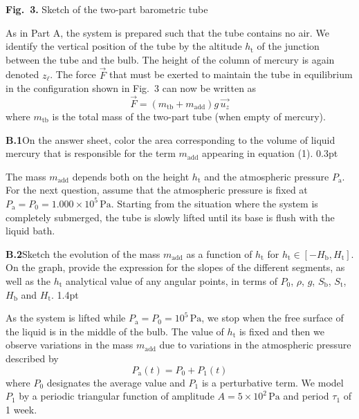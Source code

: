 \begin{center}\textbf{Fig.~3.} Sketch of the two-part barometric tube\end{center}

As in Part A, the system is prepared such that the tube contains no air. We
identify the vertical position of the tube by the altitude $h_\mathrm{t}$ of
the junction between the tube and the bulb. The height of the column of
mercury is again denoted $z_\ell$. The force $\overrightarrow{F}$ that must be
exerted to maintain the tube in equilibrium in the configuration shown in
Fig.~3 can now be written as
\begin{equation}
\overrightarrow{F} = \left(m_\mathrm{tb} + m_\mathrm{add}\right) g\,\overrightarrow{u_z} \tag{1}
\end{equation}
where $m_\mathrm{tb}$ is the total mass of the two-part tube (when empty of
mercury).

\textbf{B.1}\quad On the answer sheet, color the area corresponding to the
volume of liquid mercury that is responsible for the term $m_\mathrm{add}$
appearing in equation (1). \hfill 0.3pt

The mass $m_\mathrm{add}$ depends both on the height $h_\mathrm{t}$ and the
atmospheric pressure $P_\mathrm{a}$. For the next question, assume that the
atmospheric pressure is fixed at
$P_\mathrm{a} = P_0 = 1.000 \times 10^5\,\mathrm{Pa}$. Starting from the
situation where the system is completely submerged, the tube is slowly lifted
until its base is flush with the liquid bath.

\textbf{B.2}\quad Sketch the evolution of the mass $m_\mathrm{add}$ as a
function of $h_\mathrm{t}$ for
$h_\mathrm{t} \in \left[-H_\mathrm{b}, H_\mathrm{t}\right]$. On the graph,
provide the expression for the slopes of the different segments, as well as the
$h_\mathrm{t}$ analytical value of any angular points, in terms of $P_0$,
$\rho$, $g$, $S_\mathrm{b}$, $S_\mathrm{t}$, $H_\mathrm{b}$ and
$H_\mathrm{t}$. \hfill 1.4pt

As the system is lifted while $P_\mathrm{a} = P_0 = 10^5\,\mathrm{Pa}$, we stop
when the free surface of the liquid is in the middle of the bulb. The value of
$h_\mathrm{t}$ is fixed and then we observe variations in the mass
$m_\mathrm{add}$ due to variations in the atmospheric pressure described by
\begin{equation}
P_\mathrm{a}(t) = P_0 + P_1(t) \tag{2}
\end{equation}
where $P_0$ designates the average value and $P_1$ is a perturbative term. We
model $P_1$ by a periodic triangular function of amplitude
$A = 5 \times 10^2\,\mathrm{Pa}$ and period $\tau_1$ of 1 week.

